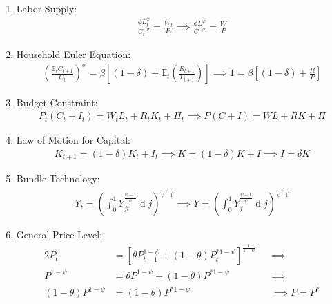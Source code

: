 \documentclass[
	12pt, 
	]{article}
\numberwithin{equation}{section}
\DeclareMathOperator{\dif}{d}
\theoremstyle{definition}
\theoremstyle{plain}
\theoremstyle{plain}
\theoremstyle{plain}
\begin{document}
\begin{enumerate}
	\item Labor Supply:
	\begin{align}
	\label{eq:ss-household-labor-supply}
		\frac{\phi L_t^{\varphi}}{C_t^{-\sigma}} = \frac{W_t}{P_t} \implies
		\frac{\phi L^{\varphi}}{C^{-\sigma}} = \frac{W}{P}
	\end{align}
	
	\item Household Euler Equation: 
	\begin{align}
	\label{eq:ss-household-euler-equation}
		\left( \frac{\mathbb{E}_t C_{t+1}}{C_t} \right)^\sigma = \beta \left[ (1-\delta) + \mathbb{E}_t \left(\frac{R_{t+1}}{P_{t+1}}\right) \right] \implies 
		1 = \beta \left[ (1-\delta) + \frac{R}{P} \right]
	\end{align}
	
	\item Budget Constraint: 
	\begin{align}
	\label{eq:ss-household-budget-constraint}
		P_t (C_t + I_t) = W_t L_t + R_t K_t + \Pi_t \implies 
		P (C + I) = W L + R K + \Pi
	\end{align}
	
	\item Law of Motion for Capital:
	\begin{align}
	\label{eq:ss-law-of-motion-for-capital}
		K_{t+1} = (1-\delta)K_t + I_t \implies
		K = (1-\delta)K + I \implies I = \delta K
	\end{align}
	
	\item Bundle Technology:
	\begin{align}
	\label{eq:ss-final-good-firm-bundle-rule}
		Y_t = \left( \int_{0}^{1} Y_{jt}^{\frac{\psi-1}{\psi}} \dif j \right)^{\frac{\psi}{\psi-1}} \implies 
		Y = \left( \int_{0}^{1} Y_{j}^{\frac{\psi-1}{\psi}} \dif j \right)^{\frac{\psi}{\psi-1}}
	\end{align}
	
	\item General Price Level:
	\begin{alignat}{2}
	\label{eq:ss-general-price-level}
		P_t &= \left[ \theta P_{t-1}^{1-\psi} + (1-\theta) P_t^{\ast 1-\psi} \right]^\frac{1}{1-\psi} &&\implies \nonumber \\
		P^{1-\psi} &= \theta P^{1-\psi} + (1-\theta) P^{\ast 1-\psi} &&\implies \nonumber \\ 
		(1-\theta) P^{1-\psi} &= (1-\theta) P^{\ast 1-\psi} &&\implies P = P^\ast
	\end{alignat}
	

\end{enumerate}
\end{document}

